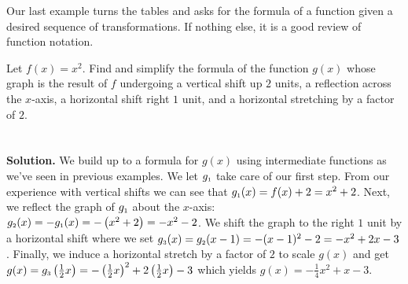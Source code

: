 Our last example turns the tables and asks for the formula of a function given a desired sequence of transformations.  If nothing else, it is a good review of function notation.


\begin{example}  \label{graphingcalctrans} Let $f(x) = x^2$.  Find and simplify the formula of the function $g(x)$ whose graph is the result of $f$ undergoing
 a vertical shift up $2$ units, a reflection across the $x$-axis, a horizontal shift right $1$ unit, and a horizontal stretching by a factor of $2$.
\\%
\\ 
\\
{\bf Solution.}  We build up to a formula for $g(x)$ using intermediate functions as we've seen in previous examples.  We let $g_{\mbox{\tiny$1$}}$ take care of our first step.  From our experience with vertical shifts we can see that $g_{\mbox{\tiny$1$}}(x) = f(x) + 2 = x^2+2$.  Next, we reflect the graph of $g_{\mbox{\tiny$1$}}$ about the $x$-axis:  $g_{\mbox{\tiny$2$}}(x) = -g_{\mbox{\tiny$1$}}(x) = -\left(x^2+2\right) = -x^2-2$.  We shift the graph to the right $1$ unit by a horizontal shift where we set $g_{\mbox{\tiny$3$}}(x) = g_{\mbox{\tiny$2$}}(x-1) = -(x-1)^2-2 = -x^2+2x-3$.  Finally, we induce a horizontal stretch by a factor of $2$ to scale $g(x)$ and get $g(x) = g_{\mbox{\tiny$3$}}\left(\frac{1}{2} x\right) = -\left(\frac{1}{2} x\right)^2+2\left(\frac{1}{2} x\right)-3$ which yields $g(x) = -\frac{1}{4} x^2 + x -3$.  
\end{example}

